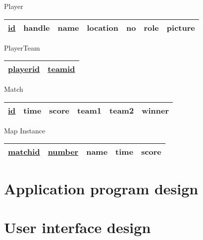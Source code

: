 \documentclass[a4paper]{article}
\begin{document}
    Player\\
    \begin{tabular}{ |c|c|c|c|c|c|c| }
        \hline
        \underline{id} & handle & name & location & no & role & picture\\
        \hline
    \end{tabular}

    \vspace{0.5cm}

    PlayerTeam\\
    \begin{tabular}{ |c|c| }
        \hline
        \underline{playerid} & \underline{teamid}\\
        \hline
    \end{tabular}

    \vspace{0.5cm}

    Match\\
    \begin{tabular}{ |c|c|c|c|c|c| }
        \hline
        \underline{id} & time & score & team1 & team2 & winner\\
        \hline
    \end{tabular}

    \vspace{0.5cm}

    Map Instance\\
    \begin{tabular}{ |c|c|c|c|c| }
        \hline
        \underline{matchid} & \underline{number} & name & time & score\\
        \hline
    \end{tabular}

    \section{Application program design}

    \section{User interface design}
\end{document}
